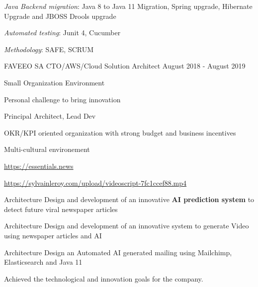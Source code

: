 \begin{cventries}
{{\begin{cvitems}
                    \item{\emph{Java Backend migration}: Java 8 to Java 11 Migration, Spring upgrade, Hibernate Upgrade and JBOSS Drools upgrade}
                    \item{\emph{Automated testing}: Junit 4, Cucumber}
                    \item{\emph{Methodology}: SAFE, SCRUM}
                \end{cvitems}
            }
        }
        \cventry
        {} %
        {} %
        {} %
        {} %
        {
            \globalexperience
            {FAVEEO SA} %
            {CTO/AWS/Cloud Solution Architect} %
            {August 2018 - August 2019} %
            {
                \begin{cvitems} %
                    \item{Small Organization Environment}
                    \item{Personal challenge to bring innovation}
                    \item{Principal Architect, Lead Dev}
                    \item{OKR/KPI oriented organization with strong budget and business incentives }
                    \item{Multi-cultural environement}
                \end{cvitems}
            }
            {
                \begin{cvitems} %
                    \item{\url{https://essentials.news}}
                    \item{\url{https://sylvainleroy.com/upload/videoscript-7fc1ccef88.mp4}}
                    \item{Architecture Design and development of an innovative \textbf{AI prediction system} to detect future viral newspaper articles}
                    \item{Architecture Design and development of an innovative system to generate Video using newspaper articles and AI}
                    \item{Architecture Design an Automated AI generated mailing using Mailchimp, Elasticsearch and Java 11}
                    \item{Achieved the technological and innovation goals for the company.}
                \end{cvitems}
}}
\end{cventries}
